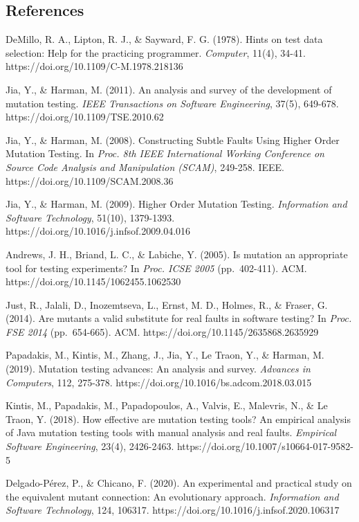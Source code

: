 \documentclass[review,12pt,authoryear]{elsarticle}
\begin{document}
\subsection{References}\label{references}

DeMillo, R. A., Lipton, R. J., \& Sayward, F. G. (1978). Hints on test
data selection: Help for the practicing programmer. \emph{Computer},
11(4), 34-41. https://doi.org/10.1109/C-M.1978.218136

Jia, Y., \& Harman, M. (2011). An analysis and survey of the development
of mutation testing. \emph{IEEE Transactions on Software Engineering},
37(5), 649-678. https://doi.org/10.1109/TSE.2010.62

Jia, Y., \& Harman, M. (2008). Constructing Subtle Faults Using Higher
Order Mutation Testing. In \emph{Proc. 8th IEEE International Working
Conference on Source Code Analysis and Manipulation (SCAM)}, 249-258.
IEEE. https://doi.org/10.1109/SCAM.2008.36

Jia, Y., \& Harman, M. (2009). Higher Order Mutation Testing.
\emph{Information and Software Technology}, 51(10), 1379-1393.
https://doi.org/10.1016/j.infsof.2009.04.016

Andrews, J. H., Briand, L. C., \& Labiche, Y. (2005). Is mutation an
appropriate tool for testing experiments? In \emph{Proc. ICSE 2005}
(pp.~402-411). ACM. https://doi.org/10.1145/1062455.1062530

Just, R., Jalali, D., Inozemtseva, L., Ernst, M. D., Holmes, R., \&
Fraser, G. (2014). Are mutants a valid substitute for real faults in
software testing? In \emph{Proc. FSE 2014} (pp.~654-665). ACM.
https://doi.org/10.1145/2635868.2635929

Papadakis, M., Kintis, M., Zhang, J., Jia, Y., Le Traon, Y., \& Harman,
M. (2019). Mutation testing advances: An analysis and survey.
\emph{Advances in Computers}, 112, 275-378.
https://doi.org/10.1016/bs.adcom.2018.03.015

Kintis, M., Papadakis, M., Papadopoulos, A., Valvis, E., Malevris, N.,
\& Le Traon, Y. (2018). How effective are mutation testing tools? An
empirical analysis of Java mutation testing tools with manual analysis
and real faults. \emph{Empirical Software Engineering}, 23(4),
2426-2463. https://doi.org/10.1007/s10664-017-9582-5

Delgado-Pérez, P., \& Chicano, F. (2020). An experimental and practical
study on the equivalent mutant connection: An evolutionary approach.
\emph{Information and Software Technology}, 124, 106317.
https://doi.org/10.1016/j.infsof.2020.106317
\end{document}
